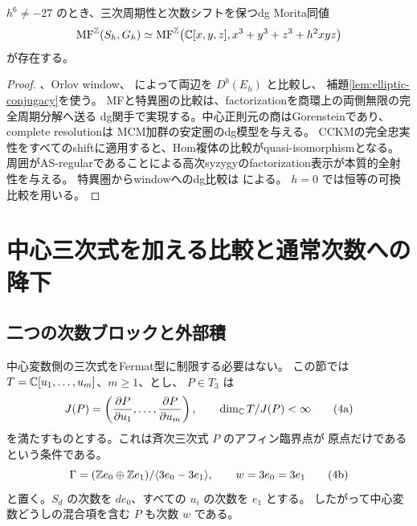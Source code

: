 \begin{corollary}\label{cor:block}
 \(h^6\ne-27\) のとき、三次周期性と次数シフトを保つdg Morita同値
 \[
 \operatorname{MF}^{\mathbb Z}(S_h,G_h)
 \simeq
 \operatorname{MF}^{\mathbb Z}\bigl(\mathbb C[x,y,z],x^3+y^3+z^3+h^2xyz\bigr)
 \]
 が存在する。
\end{corollary}
\begin{proof}
 \cite[Theorem 3.6.2]{EG}、Orlov window、
 \cite[Theorem 5.8]{CCKM}によって両辺を \(D^b(E_h)\) と比較し、
 補題\ref{lem:elliptic-conjugacy}を使う。
 MFと特異圏の比較は、factorizationを商環上の両側無限の完全周期分解へ送る
 dg関手で実現する。中心正則元の商はGorensteinであり、complete resolutionは
 MCM加群の安定圏のdg模型を与える。
 CCKMの完全忠実性をすべてのshiftに適用すると、Hom複体の比較がquasi-isomorphismとなる。
 周囲がAS-regularであることによる高次syzygyのfactorization表示が本質的全射性を与える。
 特異圏からwindowへのdg比較は \cite[Section 5, Theorem 5.8]{CT} による。
 \(h=0\) では恒等の可換比較を用いる。
\end{proof}

\section{中心三次式を加える比較と通常次数への降下}\label{sec:TS}

\subsection{二つの次数ブロックと外部積}

中心変数側の三次式をFermat型に制限する必要はない。
この節では \(T=\mathbb C[u_1,\ldots,u_m]\)、\(m\ge1\)、とし、
\(P\in T_3\) は
\[
 J(P)=\left(\frac{\partial P}{\partial u_1},\ldots,
                 \frac{\partial P}{\partial u_m}\right),\qquad
 \dim_\mathbb C T/J(P)<\infty                                      \tag{4a}\label{eq:central-isolated}
\]
を満たすものとする。これは斉次三次式 \(P\) のアフィン臨界点が
原点だけであるという条件である。
\[
 \Gamma=(\mathbb Z e_0\oplus\mathbb Z e_1)/\langle3e_0-3e_1\rangle,
 \qquad w=3e_0=3e_1                                       \tag{4b}\label{eq:central-gamma}
\]
と置く。\(S_d\) の次数を \(de_0\)、すべての \(u_i\) の次数を \(e_1\) とする。
したがって中心変数どうしの混合項を含む \(P\) も次数 \(w\) である。

